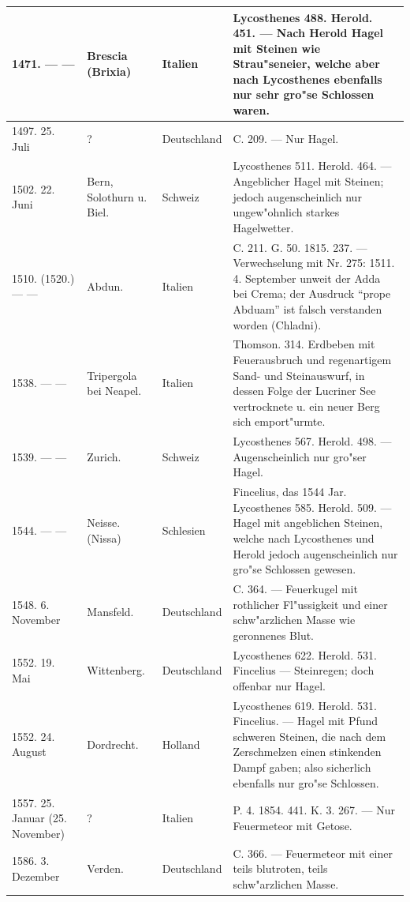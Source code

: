 \documentclass[a4paper, 8pt, oneside, polutonikogreek, german]{article}
\begin{document}
\begin{center}
\begin{longtable}{| p{20mm} | p{25mm} | p{20mm} | p{55mm} |}
        1471. --- --- & Brescia (Brixia) & Italien & Lycosthenes 488. Herold. 451. --- Nach Herold Hagel mit Steinen wie Strau"seneier, welche aber nach Lycosthenes ebenfalls nur sehr gro"se Schlossen waren. \\ \hline
        1497. 25. Juli & ? & Deutschland & C. 209. --- Nur Hagel. \\ \hline
        1502. 22. Juni & Bern, Solothurn u. Biel. & Schweiz & Lycosthenes 511. Herold. 464. --- Angeblicher Hagel mit Steinen; jedoch augenscheinlich nur ungew"ohnlich starkes Hagelwetter. \\ \hline
        1510. (1520.) --- --- & Abdun. & Italien & C. 211. G. 50. 1815. 237. --- Verwechselung mit Nr. 275: 1511. 4. September unweit der Adda bei Crema; der Ausdruck "`prope Abduam"' ist falsch verstanden worden (Chladni). \\ \hline
        1538. --- --- & Tripergola bei Neapel. & Italien & Thomson. 314. Erdbeben mit Feuerausbruch und regenartigem Sand- und Steinauswurf, in dessen Folge der Lucriner See vertrocknete u. ein neuer Berg sich emport"urmte. \\ \hline
        1539. --- --- & Zurich. & Schweiz & Lycosthenes 567. Herold. 498. --- Augenscheinlich nur gro"ser Hagel. \\ \hline
        1544. --- --- & Neisse. (Nissa) & Schlesien & Fincelius, das 1544 Jar. Lycosthenes 585. Herold. 509. --- Hagel mit angeblichen Steinen, welche nach Lycosthenes und Herold jedoch augenscheinlich nur gro"se Schlossen gewesen. \\ \hline
        1548. 6. November & Mansfeld. & Deutschland & C. 364. --- Feuerkugel mit rothlicher Fl"ussigkeit und einer schw"arzlichen Masse wie geronnenes Blut. \\ \hline
        1552. 19. Mai & Wittenberg. & Deutschland & Lycosthenes 622. Herold. 531. Fincelius --- Steinregen; doch offenbar nur Hagel. \\ \hline
        1552. 24. August & Dordrecht. & Holland & Lycosthenes 619. Herold. 531. Fincelius. --- Hagel mit Pfund schweren Steinen, die nach dem Zerschmelzen einen stinkenden Dampf gaben; also sicherlich ebenfalls nur gro"se Schlossen. \\ \hline
        1557. 25. Januar (25. November) & ? & Italien & P. 4. 1854. 441. K. 3. 267. --- Nur Feuermeteor mit Getose. \\ \hline
        1586. 3. Dezember & Verden. & Deutschland & C. 366. --- Feuermeteor mit einer teils blutroten, teils schw"arzlichen Masse. \\ \hline

\end{longtable}
\end{center}
\end{document}
